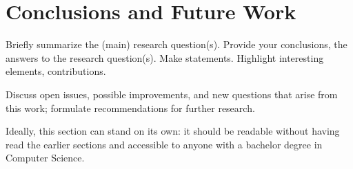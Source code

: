 \section{Conclusions and Future Work}
Briefly summarize the (main) research question(s).
Provide your conclusions, the answers to the research question(s).
Make statements.
Highlight interesting elements, contributions.

Discuss open issues, possible improvements, and new questions that arise from this work; formulate recommendations for further research.

Ideally, this section can stand on its own: it should be readable without having read the earlier sections and accessible to anyone with a bachelor degree in Computer Science.
